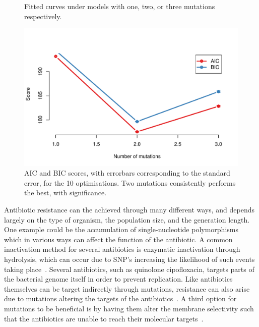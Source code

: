 \documentclass[10pt]{article}\usepackage[]{graphicx}\usepackage[]{color}
\makeatletter
\def\maxwidth{ %
  \ifdim\Gin@nat@width>\linewidth
    \linewidth
  \else
    \Gin@nat@width
  \fi
}
\theoremstyle{plain}
\makeatother
\begin{document}
\begin{multicols*}{2}
\begin{Schunk}
\begin{figure}[H]
{}

\caption[Fitted curves under models with one, two, or three mutations respectively]{Fitted curves under models with one, two, or three mutations respectively.}\label{fig:2_fitted_curves}
\end{figure}
\end{Schunk}

\begin{Schunk}
\begin{figure}[H]

{\centering \includegraphics[width=\maxwidth]{figure/twocolumn-2_aic_bic-1} 

}

\caption[AIC and BIC scores, with errorbars corresponding to the standard error, for the 10 optimisations]{AIC and BIC scores, with errorbars corresponding to the standard error, for the 10 optimisations. Two mutations consistently performs the best, with significance.}\label{fig:2_aic_bic}
\end{figure}
\end{Schunk}

Antibiotic resistance can the achieved through many different ways, and depends largely on the type of organism, the population size, and the generation length. One example could be the accumulation of single-nucleotide polymorphisms which in various ways can affect the function of the antibiotic. A common inactivation method for several antibiotics is enzymatic inactivation through hydrolysis, which can occur due to SNP's increasing the likelihood of such events taking place~\cite{martinez2000mutation}. Several antibiotics, such as quinolone cipofloxacin, targets parts of the bacterial genome itself in order to prevent replication. Like antibiotics themselves can be target indirectly through mutations, resistance can also arise due to mutations altering the targets of the antibiotics~\cite{truong1997novel}. A third option for mutations to be beneficial is by having them alter the membrane selectivity such that the antibiotics are unable to reach their molecular targets~\cite{delcour2009outer}. 


\end{multicols*}
\end{document}
